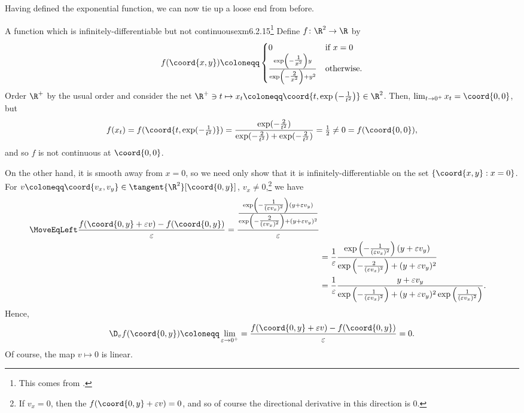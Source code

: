 Having defined the exponential function, we can now tie up a loose end from before.
\begin{exm}{A function which is infinitely-differentiable but not continuous}{exm6.2.15}\footnote{This comes from \cite[pg.~116]{Gelbaum}.}
Define $f\colon \R ^2\rightarrow \R$ by
\begin{equation}
f(\coord{x,y})\coloneqq \begin{cases}0 & \text{if }x=0 \\ \frac{\exp \left( -\tfrac{1}{x^2}\right) y}{\exp \left( -\tfrac{2}{x^2}\right) +y^2} & \text{otherwise.}\end{cases}
\end{equation}
Order $\R ^+$ by the usual order and consider the net $\R ^+\ni t\mapsto x_t\coloneqq \coord{t,\exp \left( -\frac{1}{t^2}\right) }\in \R ^2$.  Then, $\lim _{t\to 0^+}x_t=\coord{0,0}$, but
\begin{equation}
f(x_t)=f(\coord{t,\exp (-\tfrac{1}{t^2})})=\frac{\exp (-\tfrac{2}{t^2})}{\exp (-\tfrac{2}{t^2})+\exp (-\tfrac{2}{t^2})}=\tfrac{1}{2}\neq 0=f(\coord{0,0}),
\end{equation}
and so $f$ is not continuous at $\coord{0,0}$.

On the other hand, it is smooth away from $x=0$, so we need only show that it is infinitely-differentiable on the set $\{ \coord{x,y}:x=0\}$.  For $v\coloneqq \coord{v_x,v_y}\in \tangent{\R ^2}[\coord{0,y}]$, $v_x\neq 0$,\footnote{If $v_x=0$, then the $f(\coord{0,y}+\varepsilon v)=0$, and so of course the directional derivative in this direction is $0$.} we have
\begin{equation}
\begin{split}
\MoveEqLeft
\frac{f(\coord{0,y}+\varepsilon v)-f(\coord{0,y})}{\varepsilon}=\frac{\frac{\exp \left( -\tfrac{1}{(\varepsilon v_x)^2}\right) (y+\varepsilon v_y)}{\exp \left(-\tfrac{2}{(\varepsilon v_x)^2}\right) +(y+\varepsilon v_y)^2}}{\varepsilon} \\
& =\frac{1}{\varepsilon}\frac{\exp \left( -\tfrac{1}{(\varepsilon v_x)^2}\right) (y+\varepsilon v_y)}{\exp \left( -\tfrac{2}{(\varepsilon v_x)^2}\right) +(y+\varepsilon v_y)^2} \\
& =\frac{1}{\varepsilon}\frac{y+\varepsilon v_y}{\exp \left( -\tfrac{1}{(\varepsilon v_x)^2}\right) +(y+\varepsilon v_y)^2\exp \left( \tfrac{1}{(\varepsilon v_x)^2}\right) }.
\end{split}
\end{equation}
Hence,
\begin{equation}
\D _vf(\coord{0,y})\coloneqq \lim _{\varepsilon \to 0^+}=\frac{f(\coord{0,y}+\varepsilon v)-f(\coord{0,y})}{\varepsilon}=0.
\end{equation}
Of course, the map $v\mapsto 0$ is linear.


\end{exm}
